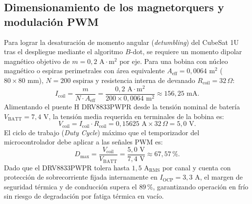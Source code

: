 \documentclass[11pt,a4paper]{article}
\begin{document}
\subsection{Dimensionamiento de los magnetorquers y modulación PWM}
Para lograr la desaturación de momento angular (\emph{detumbling}) del CubeSat 1U tras el despliegue mediante el algoritmo $B$-dot, se requiere un momento dipolar magnético objetivo de $m = 0{,}2\text{ A}\cdot\text{m}^2$ por eje. Para una bobina con núcleo magnético o espiras perimetrales con área equivalente $A_{\text{eff}} = 0{,}0064\text{ m}^2$ ($80 \times 80\text{ mm}$), $N = 200\text{ espiras}$ y resistencia interna de devanado $R_{\text{coil}} = 32\,\Omega$:
\begin{equation}
I_{\text{coil}} = \frac{m}{N \cdot A_{\text{eff}}} = \frac{0{,}2\text{ A}\cdot\text{m}^2}{200 \times 0{,}0064\text{ m}^2} \approx 156{,}25\text{ mA}.
\end{equation}
Alimentando el puente H DRV8833PWPR desde la tensión nominal de batería $V_{\text{BATT}} = 7{,}4\text{ V}$, la tensión media requerida en terminales de la bobina es:
\begin{equation}
V_{\text{coil}} = I_{\text{coil}} \cdot R_{\text{coil}} = 0{,}15625\text{ A} \times 32\,\Omega = 5{,}0\text{ V}.
\end{equation}
El ciclo de trabajo (\emph{Duty Cycle}) máximo que el temporizador del microcontrolador debe aplicar a las señales PWM es:
\begin{equation}
D_{\text{max}} = \frac{V_{\text{coil}}}{V_{\text{BATT}}} = \frac{5{,}0\text{ V}}{7{,}4\text{ V}} \approx 67{,}57\,\%.
\end{equation}
Dado que el DRV8833PWPR tolera hasta $1{,}5\text{ A}_{\text{RMS}}$ por canal y cuenta con protección de sobrecorriente fijada internamente en $I_{\text{OCP}} = 3{,}3\text{ A}$, el margen de seguridad térmica y de conducción supera el $89\,\%$, garantizando operación en frío sin riesgo de degradación por fatiga térmica en vacío.
\end{document}
